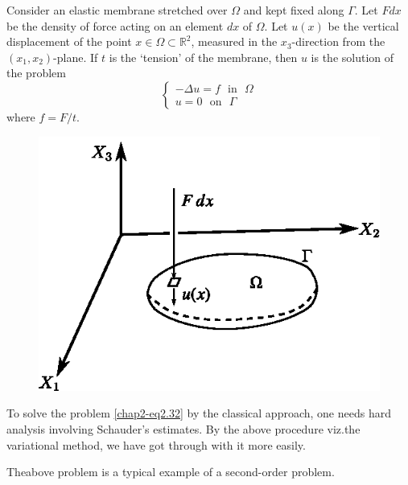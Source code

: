 Consider an elastic membrane stretched over $\Omega$ and kept fixed
along $\Gamma$. Let $Fdx$ be the density of force acting on an element
$dx$ of $\Omega$. Let $u(x)$ be the vertical displacement of the point
$x\in \Omega\subset \mathbb{R}^{2}$, measured in the $x_{3}$-direction
from the $(x_{1},x_{2})$-plane. If $t$ is the `tension' of the
membrane, then $u$ is the solution of the problem
\begin{equation*}
\begin{cases}
-\Delta u=f\text{~ in~ } \Omega\\
u=0\text{~ on~ }\Gamma
\end{cases}\tag{2.33}\label{chap2-eq2.33}
\end{equation*}
where $f=F/t$.
\begin{figure}[H]
\centering
\includegraphics[scale=1.1]{figure/fig2.1.eps}
\caption{}
\end{figure}

\begin{remark}\label{chap2-rem2.1}
To solve the problem \eqref{chap2-eq2.32} by the classical approach,
one needs hard analysis involving Schauder's estimates. By the above
procedure viz.\@ the variational method, we have got through with it
more easily. 

The\pageoriginale above problem is a typical example of a second-order
problem. 
\end{remark}

